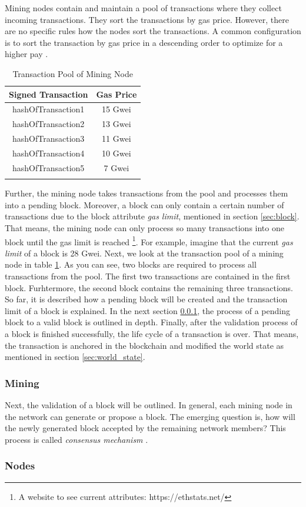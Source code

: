 Mining nodes contain and maintain a pool of transactions where they collect incoming transactions. They sort the transactions by gas price. However, there are no specific rules how the nodes sort the transactions. A common configuration is to sort the transaction by gas price in a descending order to optimize for a higher pay \cite{transaction_life_cycle}.

\begin{longtable}{c|c}
	\hline
	\hline
	Signed Transaction & Gas Price \\
	\hline
	hashOfTransaction1 & 15 Gwei \\
	hashOfTransaction2 & 13 Gwei \\
	hashOfTransaction3 & 11 Gwei \\
	hashOfTransaction4 & 10 Gwei \\
	hashOfTransaction5 & 7 Gwei \\
	\hline
	\hline
	\caption{Transaction Pool of Mining Node}
	\label{table:sorted_gas_prices}
\end{longtable} 

Further, the mining node takes transactions from the pool and processes them into a pending block. Moreover, a block can only contain a certain number of transactions due to the block attribute \textit{gas limit}, mentioned in section \ref{sec:block}. That means, the mining node can only process so many transactions into one block until the gas limit is reached \footnote{A website to see current attributes: https://ethstats.net/}. For example, imagine that the current \textit{gas limit} of a block is 28 Gwei. Next, we look at the transaction pool of a mining node in table \ref{table:sorted_gas_prices}. As you can see, two blocks are required to process all transactions from the pool. The first two transactions are contained in the first block. Furhtermore, the second block contains the remaining three transactions. 
So far, it is described how a pending block will be created and the transaction limit of a block is explained. In the next section \ref{sec:mining}, the process of a pending block to a valid block is outlined in depth. Finally, after the validation process of a block is finished successfully, the life cycle of a transaction is over. That means, the transaction is anchored in the blockchain and modified the world state as mentioned in section \ref{sec:world_state}.

\subsubsection{Mining}
\label{sec:mining}
Next, the validation of a block will be outlined. In general, each mining node in the network can generate or propose a block. The emerging question is, how will the newly generated block accepted by the remaining network members? This process is called \textit{consensus mechanism} \cite{andoni2019blockchain}. 

\subsubsection{Nodes}
\label{sec:nodes}

